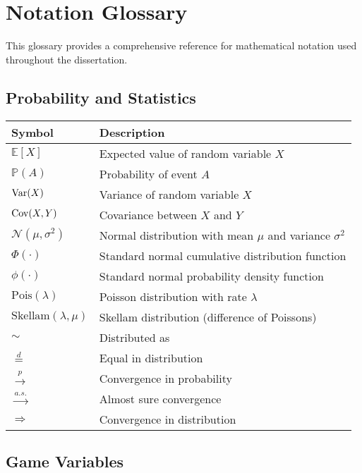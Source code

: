 \chapter*{Notation Glossary}

This glossary provides a comprehensive reference for mathematical notation used throughout the dissertation.

\section*{Probability and Statistics}

\begin{tabular}{ll}
\toprule
\textbf{Symbol} & \textbf{Description} \\
\midrule
$\mathbb{E}[X]$ & Expected value of random variable $X$ \\
$\mathbb{P}(A)$ & Probability of event $A$ \\
$\mathrm{Var}(X)$ & Variance of random variable $X$ \\
$\mathrm{Cov}(X,Y)$ & Covariance between $X$ and $Y$ \\
$\mathcal{N}(\mu, \sigma^2)$ & Normal distribution with mean $\mu$ and variance $\sigma^2$ \\
$\Phi(\cdot)$ & Standard normal cumulative distribution function \\
$\phi(\cdot)$ & Standard normal probability density function \\
$\text{Pois}(\lambda)$ & Poisson distribution with rate $\lambda$ \\
$\text{Skellam}(\lambda, \mu)$ & Skellam distribution (difference of Poissons) \\
$\sim$ & Distributed as \\
$\overset{d}{=}$ & Equal in distribution \\
$\overset{p}{\to}$ & Convergence in probability \\
$\overset{a.s.}{\to}$ & Almost sure convergence \\
$\Rightarrow$ & Convergence in distribution \\
\bottomrule
\end{tabular}

\section*{Game Variables}


